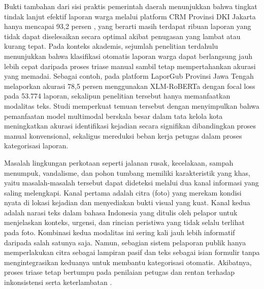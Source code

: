 Bukti tambahan dari sisi praktis pemerintah daerah menunjukkan bahwa tingkat tindak lanjut efektif laporan warga melalui platform CRM Provinsi DKI Jakarta hanya mencapai 93,2 persen \citep{harianhaluanCRMJakarta2024}, yang berarti masih terdapat ribuan laporan yang tidak dapat diselesaikan secara optimal akibat penugasan yang lambat atau kurang tepat. Pada konteks akademis, sejumlah penelitian terdahulu menunjukkan bahwa klasifikasi otomatis laporan warga dapat berlangsung jauh lebih cepat daripada proses triase manual sambil tetap mempertahankan akurasi yang memadai. Sebagai contoh, \citet{zahroFairerPublicComplaint2025} pada platform LaporGub Provinsi Jawa Tengah melaporkan akurasi 78,5 persen menggunakan XLM-RoBERTa dengan focal loss pada 53.774 laporan, sekalipun penelitian tersebut hanya memanfaatkan modalitas teks. Studi \citet{shenSmartCityGovernance2025} memperkuat temuan tersebut dengan menyimpulkan bahwa pemanfaatan model multimodal berskala besar dalam tata kelola kota meningkatkan akurasi identifikasi kejadian secara signifikan dibandingkan proses manual konvensional, sekaligus mereduksi beban kerja petugas dalam proses kategorisasi laporan.

Masalah lingkungan perkotaan seperti jalanan rusak, kecelakaan, sampah menumpuk, vandalisme, dan pohon tumbang memiliki karakteristik yang khas, yaitu masalah-masalah tersebut dapat dideteksi melalui dua kanal informasi yang saling melengkapi. Kanal pertama adalah citra (foto) yang merekam kondisi nyata di lokasi kejadian dan menyediakan bukti visual yang kuat. Kanal kedua adalah narasi teks dalam bahasa Indonesia yang ditulis oleh pelapor untuk menjelaskan konteks, urgensi, dan rincian peristiwa yang tidak selalu terlihat pada foto. Kombinasi kedua modalitas ini sering kali jauh lebih informatif daripada salah satunya saja. Namun, sebagian sistem pelaporan publik hanya memperlakukan citra sebagai lampiran pasif dan teks sebagai isian formulir tanpa mengintegrasikan keduanya untuk membantu kategorisasi otomatis. Akibatnya, proses triase tetap bertumpu pada penilaian petugas dan rentan terhadap inkonsistensi serta keterlambatan \citep{firgiaImplementasiSistemInformasi2022}.

